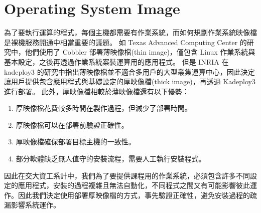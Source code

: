 \section{Operating System Image}
為了要執行運算的程式，每個主機都需要有作業系統，而如何規劃作業系統映像檔是裸機服務開通中相當重要的議題。
如 Texas Advanced Computing Center 的研究\cite{mclay2011best}中，他們使用了 Cobbler 部署薄映像檔(thin image)，僅包含 Linux 作業系統與基本設定，之後再透過作業系統案裝運算用的應用程式。
但是 INRIA 在 kadeploy3 的研究中\cite{kadeploy3}指出薄映像檔並不適合多用戶的大型叢集運算中心，因此決定讓用戶提供包含應用程式與基礎設定的厚映像檔(thick image)，再透過 Kadeploy3 進行部署。
此外，厚映像檔相較於薄映像檔還有以下優勢：
\begin{enumerate}
\item 厚映像檔花費較多時間在製作過程，但減少了部署時間。
\item 厚映像檔可以在部署前驗證正確性。
\item 厚映像檔確保部署目標主機的一致性。
\item 部分軟體缺乏無人值守的安裝流程，需要人工執行安裝程式。
\end{enumerate}
因此在交大資工系計中，我們為了要提供課程用的作業系統，必須包含許多不同設定的應用程式，安裝的過程複雜且無法自動化，不同程式之間又有可能影響彼此運作。因此我們決定使用部署厚映像檔的方式，事先驗證正確性，避免安裝過程的疏漏影響系統運作。
